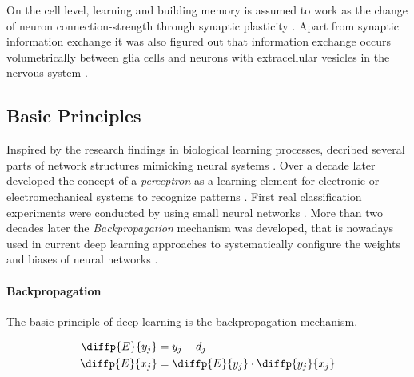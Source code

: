     On the cell level, learning and building memory is assumed to work as the change of neuron connection-strength through synaptic plasticity \citep{do1949organization,martin2000synaptic}. Apart from synaptic information exchange it was also figured out that information exchange occurs volumetrically between glia cells and neurons with extracellular vesicles in the nervous system \citep{schiera2019communcation}.

    \subsection{Basic Principles} %

        Inspired by the research findings in biological learning processes, \citeauthor{mcculloch1943logical} decribed several parts of network structures mimicking neural systems \citep{mcculloch1943logical}.
        Over a decade later \citeauthor{rosenblatt1957perceptron} developed the concept of a \emph{perceptron} as a learning element for electronic or electromechanical systems to recognize patterns \citep{rosenblatt1957perceptron}.
        First real classification experiments were conducted by \citeauthor{widrow1960adaptive} using small neural networks \citep{widrow1960adaptive}.
        More than two decades later the \emph{Backpropagation} mechanism was developed, that is nowadays used in current deep learning approaches to systematically configure the weights and biases of neural networks \citep{rumelhart1986learning}.


        \paragraph{Backpropagation} The basic principle of deep learning is the backpropagation mechanism.

        \begin{align}
            \diffp{E}{{y_j}} &= y_j - d_j \\
            \diffp{E}{{x_j}} &= \diffp{E}{{y_j}} \cdot \diffp{{y_j}}{{x_j}}
        \end{align}

